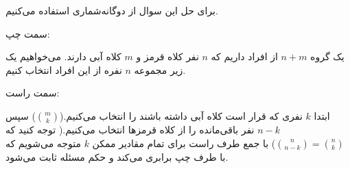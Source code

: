 \documentclass[12pt,onecolumn,a4paper]{article}
\begin{document}
برای حل این سوال از دوگانه‌شماری استفاده می‌کنیم.

سمت چپ: 

یک گروه $n+m$ از افراد داریم که $n$ نفر کلاه قرمز و $m$ کلاه آبی دارند. می‌خواهیم یک زیر مجموعه $n$ نفره از این افراد انتخاب کنیم.


سمت راست:

ابتدا $k$ نفری که قرار است کلاه آبی داشته باشند را انتخاب می‌کنیم.($\binom{m}{k}$)
سپس $n-k$ نفر باقی‌مانده را از کلاه قرمزها انتخاب می‌کنیم.( توجه کنید که
$ \binom{n}{n-k} = \binom{n}{k}$)
با جمع طرف راست برای تمام مقادیر ممکن $k$ متوجه می‌شویم که با طرف چپ برابری می‌کند و حکم مسئله ثابت می‌شود.
\end{document}
